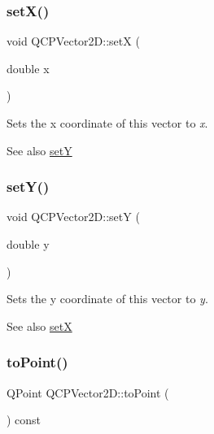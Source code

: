 \subsubsection{\texorpdfstring{set\+X()}{setX()}}
{\footnotesize\ttfamily void Q\+C\+P\+Vector2\+D\+::setX (\begin{DoxyParamCaption}\item[{double}]{x }\end{DoxyParamCaption})\hspace{0.3cm}{\ttfamily [inline]}}

Sets the x coordinate of this vector to {\itshape x}.

\begin{DoxySeeAlso}{See also}
\hyperlink{class_q_c_p_vector2_d_ada288019aa8cd51e3b30acfc07b461dc}{setY} 
\end{DoxySeeAlso}
\mbox{\label{class_q_c_p_vector2_d_ada288019aa8cd51e3b30acfc07b461dc}} 
\subsubsection{\texorpdfstring{set\+Y()}{setY()}}
{\footnotesize\ttfamily void Q\+C\+P\+Vector2\+D\+::setY (\begin{DoxyParamCaption}\item[{double}]{y }\end{DoxyParamCaption})\hspace{0.3cm}{\ttfamily [inline]}}

Sets the y coordinate of this vector to {\itshape y}.

\begin{DoxySeeAlso}{See also}
\hyperlink{class_q_c_p_vector2_d_ab4249e6ce7bfc37be56f014c54b761ae}{setX} 
\end{DoxySeeAlso}
\mbox{\label{class_q_c_p_vector2_d_add3edf75de9b7bf1abc693b973b2e906}} 
\subsubsection{\texorpdfstring{to\+Point()}{toPoint()}}
{\footnotesize\ttfamily Q\+Point Q\+C\+P\+Vector2\+D\+::to\+Point (\begin{DoxyParamCaption}{ }\end{DoxyParamCaption}) const\hspace{0.3cm}{\ttfamily [inline]}}

